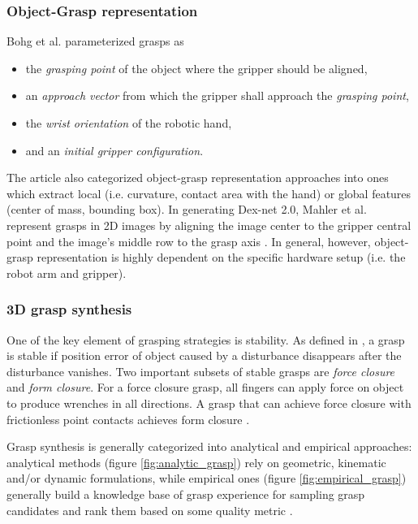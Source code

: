 \documentclass[12pt]{article}
\begin{document}
    \subsubsection{Object-Grasp representation}
    Bohg et al. \cite{Bohg2014} parameterized grasps as
    \begin{itemize}
        \item the \emph{grasping point} of the object where the gripper should be aligned,
        \item an \emph{approach vector} from which the gripper shall approach the \emph{grasping point},
        \item the \emph{wrist orientation} of the robotic hand,
        \item and an \emph{initial gripper configuration}.
    \end{itemize}
    The article also categorized object-grasp representation approaches into ones which extract local (i.e. curvature, contact area with the hand) or global features (center of mass, bounding box). In generating Dex-net 2.0, Mahler et al. represent grasps in 2D images by aligning the image center to the gripper central point and the image's middle row to the grasp axis \cite{mahler2017}. In general, however, object-grasp representation is highly dependent on the specific hardware setup (i.e. the robot arm and gripper).

    \subsubsection{3D grasp synthesis}

    One of the key element of grasping strategies is stability. As defined in \cite{Roa2015}, a grasp is stable if position error of object caused by a disturbance disappears after the disturbance vanishes. Two important subsets of stable grasps are \emph{force closure} and \emph{form closure}. For a force closure grasp, all fingers can apply force on object to produce wrenches in all directions. A grasp that can achieve force closure with frictionless point contacts achieves form closure \cite{Sahbani2012}.

    Grasp synthesis is generally categorized into analytical and empirical approaches: analytical methods (figure \ref{fig:analytic_grasp}) rely on geometric, kinematic and/or dynamic formulations, while empirical ones (figure \ref{fig:empirical_grasp}) generally build a knowledge base of grasp experience for sampling grasp candidates and rank them based on some quality metric \cite{Sahbani2012,Bohg2014}.
\end{document}
